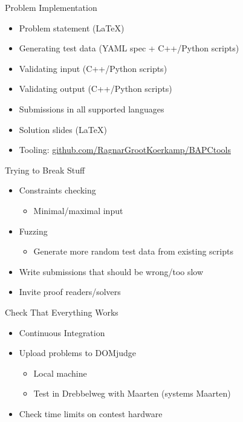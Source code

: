 \documentclass[11pt,pdf, aspectratio=169]{beamer}
\begin{document}
  \begin{frame}{Problem Implementation}
    \begin{itemize}
      \item Problem statement (LaTeX)
      \item Generating test data (YAML spec + C++/Python scripts)
      \item Validating input (C++/Python scripts)
      \item Validating output (C++/Python scripts)
      \item Submissions in all supported languages
      \item Solution slides (LaTeX) \\[1em]
      \item Tooling: \url{github.com/RagnarGrootKoerkamp/BAPCtools}
    \end{itemize}
  \end{frame}
  \begin{frame}{Trying to Break Stuff}
    \begin{itemize}
      \item Constraints checking
      \begin{itemize}
        \item Minimal/maximal input
      \end{itemize}
      \item Fuzzing
      \begin{itemize}
        \item Generate more random test data from existing scripts
      \end{itemize}
      \item Write submissions that should be wrong/too slow
      \item Invite proof readers/solvers
    \end{itemize}
  \end{frame}
  \begin{frame}{Check That Everything Works}
    \begin{itemize}
      \item Continuous Integration
      \item Upload problems to DOMjudge
      \begin{itemize}
        \item Local machine
        \item Test in Drebbelweg with Maarten (systems Maarten)
      \end{itemize}
      \item Check time limits on contest hardware
    \end{itemize}
  \end{frame}
\end{document}
